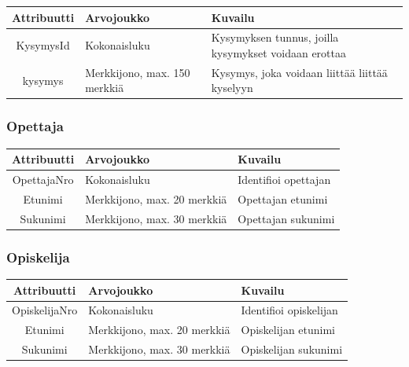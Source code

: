 \documentclass[12pt,twoside,a4paper,leqno,titlepage]{article}
\begin{document}
\begin{table}[!h]
\begin{tabular}{|c|p{5cm}|p{5cm}|}
  \hline
  \textbf{Attribuutti} & \textbf{Arvojoukko} & \textbf{Kuvailu} \\
  \hline
  KysymysId & Kokonaisluku & Kysymyksen tunnus, joilla kysymykset voidaan
  erottaa \\
  \hline
  kysymys & Merkkijono, max. 150 merkkiä & Kysymys, joka voidaan liittää
  liittää kyselyyn \\
  \hline
\end{tabular}
\end{table}

\subsubsection*{Opettaja}

\begin{table}[!h]
\begin{tabular}{|c|p{5cm}|p{5cm}|}
  \hline
  \textbf{Attribuutti} & \textbf{Arvojoukko} & \textbf{Kuvailu} \\
  \hline
  OpettajaNro & Kokonaisluku & Identifioi opettajan \\
  \hline
  Etunimi & Merkkijono, max. 20 merkkiä & Opettajan etunimi \\
  \hline
  Sukunimi & Merkkijono, max. 30 merkkiä & Opettajan sukunimi \\
  \hline
\end{tabular}
\end{table}

\subsubsection*{Opiskelija}

\begin{table}[!h]
\begin{tabular}{|c|p{5cm}|p{5cm}|}
  \hline
  \textbf{Attribuutti} & \textbf{Arvojoukko} & \textbf{Kuvailu} \\
  \hline
  OpiskelijaNro & Kokonaisluku & Identifioi opiskelijan \\
  \hline
  Etunimi & Merkkijono, max. 20 merkkiä & Opiskelijan etunimi \\
  \hline
  Sukunimi & Merkkijono, max. 30 merkkiä & Opiskelijan sukunimi \\
  \hline
\end{tabular}
\end{table}
\end{document}
